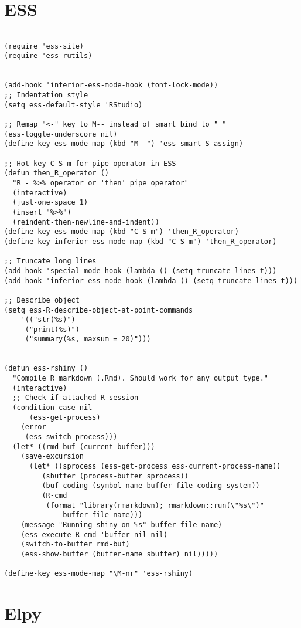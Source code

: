 \documentclass[11pt]{article}
\begin{document}
\section*{ESS}
\label{sec:org0f53ed6}

\begin{verbatim}

(require 'ess-site)
(require 'ess-rutils)


(add-hook 'inferior-ess-mode-hook (font-lock-mode))
;; Indentation style
(setq ess-default-style 'RStudio)

;; Remap "<-" key to M-- instead of smart bind to "_"
(ess-toggle-underscore nil)
(define-key ess-mode-map (kbd "M--") 'ess-smart-S-assign)

;; Hot key C-S-m for pipe operator in ESS
(defun then_R_operator ()
  "R - %>% operator or 'then' pipe operator"
  (interactive)
  (just-one-space 1)
  (insert "%>%")
  (reindent-then-newline-and-indent))
(define-key ess-mode-map (kbd "C-S-m") 'then_R_operator)
(define-key inferior-ess-mode-map (kbd "C-S-m") 'then_R_operator)

;; Truncate long lines
(add-hook 'special-mode-hook (lambda () (setq truncate-lines t)))
(add-hook 'inferior-ess-mode-hook (lambda () (setq truncate-lines t)))

;; Describe object
(setq ess-R-describe-object-at-point-commands
    '(("str(%s)")
     ("print(%s)")
     ("summary(%s, maxsum = 20)")))


(defun ess-rshiny ()
  "Compile R markdown (.Rmd). Should work for any output type."
  (interactive)
  ;; Check if attached R-session
  (condition-case nil
      (ess-get-process)
    (error
     (ess-switch-process)))
  (let* ((rmd-buf (current-buffer)))
    (save-excursion
      (let* ((sprocess (ess-get-process ess-current-process-name))
	     (sbuffer (process-buffer sprocess))
	     (buf-coding (symbol-name buffer-file-coding-system))
	     (R-cmd
	      (format "library(rmarkdown); rmarkdown::run(\"%s\")"
		      buffer-file-name)))
	(message "Running shiny on %s" buffer-file-name)
	(ess-execute R-cmd 'buffer nil nil)
	(switch-to-buffer rmd-buf)
	(ess-show-buffer (buffer-name sbuffer) nil)))))

(define-key ess-mode-map "\M-nr" 'ess-rshiny)

\end{verbatim}

\section*{Elpy}
\label{sec:org4814d00}
\end{document}
